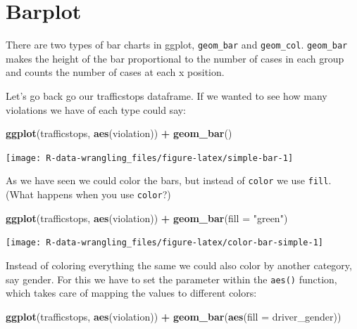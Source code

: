 \documentclass[]{book}
\newenvironment{Shaded}{\begin{snugshade}}{\end{snugshade}}
\newcommand{\DataTypeTok}[1]{\textcolor[rgb]{0.13,0.29,0.53}{#1}}
\newcommand{\KeywordTok}[1]{\textcolor[rgb]{0.13,0.29,0.53}{\textbf{#1}}}
\newcommand{\NormalTok}[1]{#1}
\newcommand{\OperatorTok}[1]{\textcolor[rgb]{0.81,0.36,0.00}{\textbf{#1}}}
\newcommand{\StringTok}[1]{\textcolor[rgb]{0.31,0.60,0.02}{#1}}
\begin{document}
\hypertarget{barplot}{%
\section{Barplot}\label{barplot}}

There are two types of bar charts in ggplot, \texttt{geom\_bar} and \texttt{geom\_col}. \texttt{geom\_bar} makes the height of the bar proportional to the number of cases in each group and counts the number of cases at each x position.

Let's go back go our trafficstops dataframe. If we wanted to see how many violations we have of each type could say:

\begin{Shaded}
\begin{Highlighting}[]
\KeywordTok{ggplot}\NormalTok{(trafficstops, }\KeywordTok{aes}\NormalTok{(violation)) }\OperatorTok{+}\StringTok{ }
\StringTok{  }\KeywordTok{geom_bar}\NormalTok{()}
\end{Highlighting}
\end{Shaded}

\texttt{[image: R-data-wrangling\_files/figure-latex/simple-bar-1]}

As we have seen we could color the bars, but instead of \texttt{color} we use \texttt{fill}. (What happens when you use \texttt{color}?)

\begin{Shaded}
\begin{Highlighting}[]
\KeywordTok{ggplot}\NormalTok{(trafficstops, }\KeywordTok{aes}\NormalTok{(violation)) }\OperatorTok{+}\StringTok{ }
\StringTok{  }\KeywordTok{geom_bar}\NormalTok{(}\DataTypeTok{fill =} \StringTok{"green"}\NormalTok{)}
\end{Highlighting}
\end{Shaded}

\texttt{[image: R-data-wrangling\_files/figure-latex/color-bar-simple-1]}

Instead of coloring everything the same we could also color by another category, say gender. For this we have to set the parameter within the \texttt{aes()} function, which takes care of mapping the values to different colors:

\begin{Shaded}
\begin{Highlighting}[]
\KeywordTok{ggplot}\NormalTok{(trafficstops, }\KeywordTok{aes}\NormalTok{(violation)) }\OperatorTok{+}\StringTok{ }
\StringTok{  }\KeywordTok{geom_bar}\NormalTok{(}\KeywordTok{aes}\NormalTok{(}\DataTypeTok{fill =}\NormalTok{ driver_gender))}
\end{Highlighting}
\end{Shaded}
\end{document}
